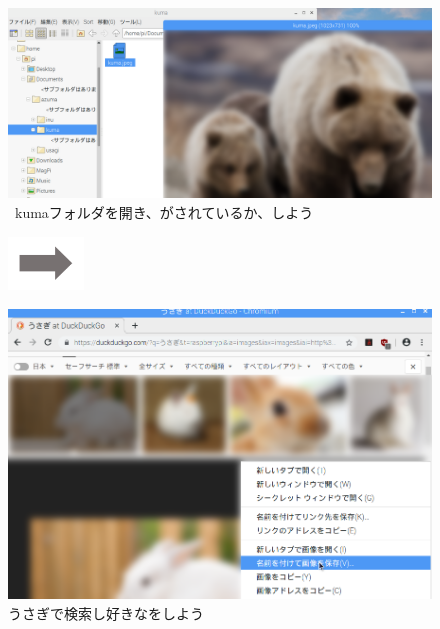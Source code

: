 \begin{figure}[t]
  \begin{minipage}{0.4\textwidth}
    \includegraphics[width=\linewidth]{text01-img/textbook-img102.png}
     \ kumaフォルダを開き、がされているか、しよう
  \end{minipage}
  \includegraphics[width=2cm]{text01-img/textbook-img073.png}
  \begin{minipage}{0.4\textwidth}
    \includegraphics[width=\linewidth]{text01-img/textbook-img101.png}
     うさぎで検索し好きなをしよう
  \end{minipage}

  \vspace{60mm}

\end{figure}

\bigskip

